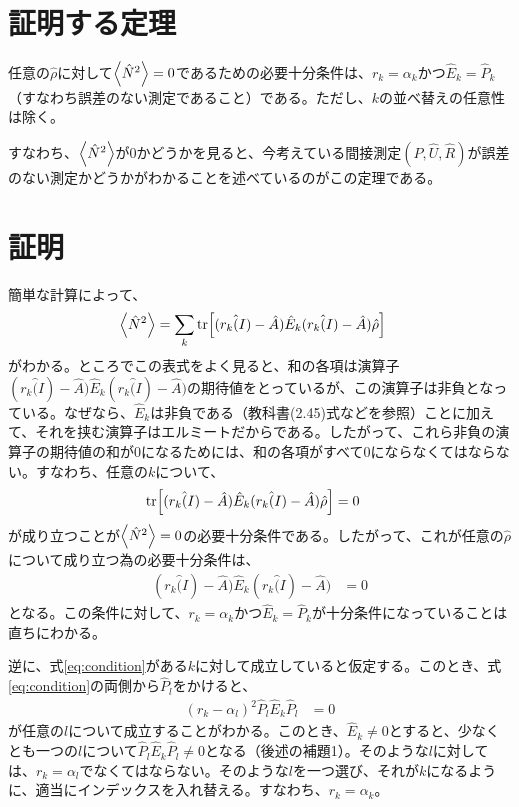 \documentclass[uplatex,dvipdfmx, a4j]{jsarticle}
\newcommand{\ope}[1]{\hat{#1}}
\newcommand{\proj}{\ope{P}}
\begin{document}
\section{証明する定理}
任意の$\ope{\rho}$に対して$\expval{\ope{N}^2}=0$であるための必要十分条件は、$r_k = \alpha_k$かつ$\ope{E}_k = \ope{P}_k$（すなわち誤差のない測定であること）である。ただし、$k$の並べ替えの任意性は除く。

すなわち、$\expval{\ope{N}^2}$が0かどうかを見ると、今考えている間接測定$(P, \ope{U}, \ope{R})$が誤差のない測定かどうかがわかることを述べているのがこの定理である。

\section{証明}
簡単な計算によって、
\begin{align}
	\expval{\ope{N}^2} &= \sum_k \tr[(r_k\ope(I)-\ope{A})\ope{E}_k(r_k\ope(I)-\ope{A})\ope{\rho}]
\end{align}
がわかる。ところでこの表式をよく見ると、和の各項は演算子$(r_k\ope(I)-\ope{A})\ope{E}_k(r_k\ope(I)-\ope{A})$の期待値をとっているが、この演算子は非負となっている。なぜなら、$\ope{E}_k$は非負である（教科書(2.45)式などを参照）ことに加えて、それを挟む演算子はエルミートだからである。したがって、これら非負の演算子の期待値の和が0になるためには、和の各項がすべて0にならなくてはならない。すなわち、任意の$k$について、
\begin{align}
	\tr[(r_k\ope(I)-\ope{A})\ope{E}_k(r_k\ope(I)-\ope{A})\ope{\rho}] &= 0
\end{align}
が成り立つことが$\expval{\ope{N}^2}=0$の必要十分条件である。したがって、これが任意の$\ope{\rho}$について成り立つ為の必要十分条件は、
\begin{align}
	(r_k\ope(I)-\ope{A})\ope{E}_k(r_k\ope(I)-\ope{A}) &= 0 \label{eq:condition}
\end{align}
となる。この条件に対して、$r_k = \alpha_k$かつ$\ope{E}_k = \ope{P}_k$が十分条件になっていることは直ちにわかる。

逆に、式\eqref{eq:condition}がある$k$に対して成立していると仮定する。このとき、式\eqref{eq:condition}の両側から$\proj_l$をかけると、
\begin{align}
	(r_k-\alpha_l)^2 \proj_l\ope{E}_k\proj_l &= 0
\end{align}
が任意の$l$について成立することがわかる。このとき、$\ope{E}_k\neq 0$とすると、少なくとも一つの$l$について$\proj_l\ope{E}_k\proj_l\neq 0$となる（後述の補題1）。そのような$l$に対しては、$r_k = \alpha_l$でなくてはならない。そのような$l$を一つ選び、それが$k$になるように、適当にインデックスを入れ替える。すなわち、$r_k = \alpha_k$。
\end{document}
